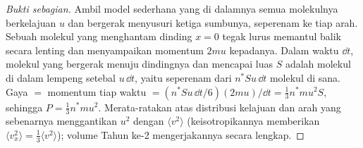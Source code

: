 \begin{proof}[Bukti sebagian]
Ambil model sederhana yang di dalamnya semua molekulnya berkelajuan $u$ dan
bergerak menyusuri ketiga sumbunya, seperenam ke tiap arah. Sebuah molekul
yang menghantam dinding $x = 0$ tegak lurus memantul balik secara lenting dan menyampaikan
momentum $2mu$ kepadanya. Dalam waktu $\dd t$, molekul yang bergerak menuju
dindingnya dan mencapai luas $S$ adalah molekul di dalam lempeng setebal $u\,\dd t$,
yaitu seperenam dari $n^*Su\,\dd t$ molekul di sana. Gaya $=$
momentum tiap waktu $= (n^*Su\,\dd t/6)(2mu)/\dd t = \tfrac13 n^*mu^2S$, sehingga
$P = \tfrac13 n^*mu^2$. Merata-ratakan atas distribusi kelajuan dan arah
yang sebenarnya menggantikan $u^2$ dengan $\langle v^2\rangle$ (keisotropikannya memberikan
$\langle v_x^2\rangle = \tfrac13\langle v^2\rangle$); volume Tahun ke-2 mengerjakannya
secara lengkap.
\end{proof}

